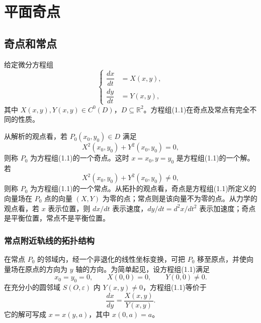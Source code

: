 
\setchapterimage{}
\setchapterintro{}
\chapter{平面奇点}

\newcommand{\chTwoFigurePlaceholder}[1]{%
  \begin{center}
    \fbox{\parbox{0.72\textwidth}{\centering\vspace{2.7cm}图~#1\\（图片占位）\vspace{2.7cm}}}
  \end{center}%
}

\section{奇点和常点}

给定微分方程组
\[
\left\{
\begin{aligned}
\dfrac{dx}{dt}&=X(x,y),\\
\dfrac{dy}{dt}&=Y(x,y),
\end{aligned}
\right.\tag{1.1}
\]
其中 $X(x,y),Y(x,y)\in C^0(D)$，$D\subseteq\mathbb{R}^2$。方程组(1.1)在奇点及常点有完全不同的性质。

从解析的观点看，若 $P_0(x_0,y_0)\in D$ 满足
\[
X^2(x_0,y_0)+Y^2(x_0,y_0)=0,
\]
则称 $P_0$ 为方程组(1.1)的一个奇点。这时 $x=x_0,y=y_0$ 是方程组(1.1)的一个解。若
\[
X^2(x_0,y_0)+Y^2(x_0,y_0)\ne0,
\]
则称 $P_0$ 为方程组(1.1)的一个常点。从拓扑的观点看，奇点是方程组(1.1)所定义的向量场在 $P_0$ 点的向量 $(X,Y)$ 为零的点；常点则是该向量不为零的点。从力学的观点看，若 $x$ 表示位置，则 $dx/dt$ 表示速度，$dy/dt=d^2x/dt^2$ 表示加速度；奇点是平衡位置，常点不是平衡位置。

\subsection*{常点附近轨线的拓扑结构}

在常点 $P_0$ 的邻域内，经一个非退化的线性坐标变换，可把 $P_0$ 移至原点，并使向量场在原点的方向为 $y$ 轴的方向。为简单起见，设方程组(1.1)满足
\[
x_0=y_0=0,\qquad X(0,0)=0,\qquad Y(0,0)\ne0.
\]
在充分小的圆邻域 $S(O,\varepsilon)$ 内 $Y(x,y)\ne0$，方程组(1.1)等价于
\[
\dfrac{dx}{dy}=\dfrac{X(x,y)}{Y(x,y)}.\tag{1.2}
\]
它的解可写成 $x=x(y,a)$，其中 $x(0,a)=a$。

